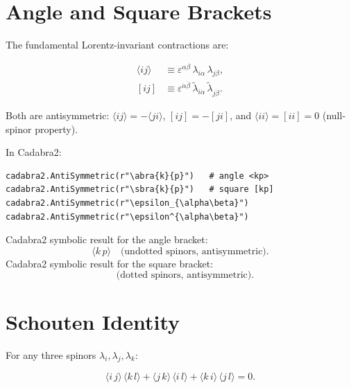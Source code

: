 \documentclass[12pt]{article}
\newcommand{\abra}[2]{\langle #1\, #2 \rangle}
\newcommand{\agra}[2]{\langle #1\, #2 \rangle}
\newcommand{\sbra}[2]{[ #1\, #2 ]}
\begin{document}
\section{Angle and Square Brackets}\label{sec:brackets}

The fundamental Lorentz-invariant contractions are:

\begin{mdframed}
\begin{align}
\langle ij\rangle &\equiv \varepsilon^{\alpha\beta}\,
\lambda_{i\alpha}\,\lambda_{j\beta} , \tag{50.16} \\[2mm]
[ij] &\equiv \varepsilon^{\dot\alpha\dot\beta}\,
\tilde\lambda_{i\dot\alpha}\,\tilde\lambda_{j\dot\beta} . \tag{50.17}
\end{align}
\end{mdframed}

Both are antisymmetric: $\langle ij\rangle=-\langle ji\rangle$,
$[ij]=-[ji]$, and $\langle ii\rangle=[ii]=0$ (null-spinor property).

In Cadabra2:
\begin{verbatim}
cadabra2.AntiSymmetric(r"\abra{k}{p}")   # angle <kp>
cadabra2.AntiSymmetric(r"\sbra{k}{p}")   # square [kp]
cadabra2.AntiSymmetric(r"\epsilon_{\alpha\beta}")
cadabra2.AntiSymmetric(r"\epsilon^{\alpha\beta}")
\end{verbatim}

Cadabra2 symbolic result for the angle bracket:
\begin{equation}
\agra{k}{p}\quad\text{(undotted spinors, antisymmetric)} .
\end{equation}
Cadabra2 symbolic result for the square bracket:
\begin{equation}
\sbra{k}{p}\quad\text{(dotted spinors, antisymmetric)} .
\end{equation}

\section{Schouten Identity}\label{sec:schouten}

For any three spinors $\lambda_i,\lambda_j,\lambda_k$:

\begin{mdframed}[backgroundcolor=yellow!5]
\begin{equation}
\agra{i}{j}\,\agra{k}{l}
+ \agra{j}{k}\,\agra{i}{l}
+ \agra{k}{i}\,\agra{j}{l} = 0 .
\tag{50.21}
\end{equation}
\end{mdframed}
\end{document}
